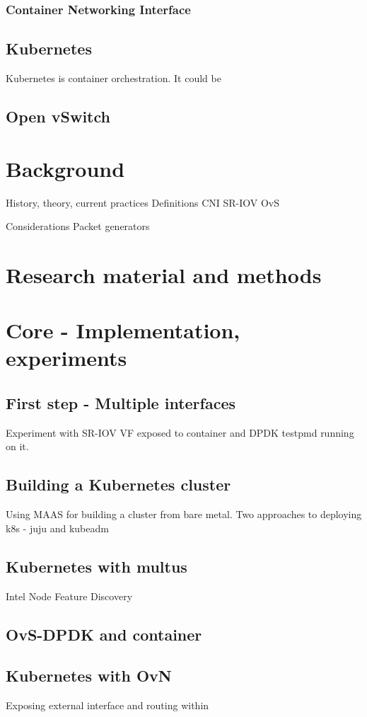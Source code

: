 \documentclass[english, 12pt, a4paper, elec, utf8, a-1b, online]{aaltothesis}
\begin{document}
\subsubsection{Container Networking Interface}
\subsection{Kubernetes}
Kubernetes is container orchestration. It could be 
\subsection{Open vSwitch}
\section{Background}
	History, theory, current practices
	Definitions
		CNI
		SR-IOV
		OvS

	Considerations
		Packet generators
\clearpage
\section{Research material and methods}

\clearpage
\section{Core - Implementation, experiments}
\subsection{First step - Multiple interfaces}
Experiment with SR-IOV VF exposed to container and DPDK testpmd running on it.
\subsection{Building a Kubernetes cluster}
Using MAAS for building a cluster from bare metal.
Two approaches to deploying k8s - juju and kubeadm
\subsection{Kubernetes with multus}
Intel Node Feature Discovery
\subsection{OvS-DPDK and container}
\subsection{Kubernetes with OvN}
Exposing external interface and routing within
\clearpage
\end{document}
